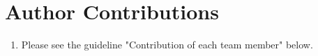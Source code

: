 \documentclass[11pt,letterpaper]{article}
\begin{document}
\section{Author Contributions}
{\color{red}
\begin{enumerate}
    \item Please see the guideline "Contribution of each team member" below.
\end{enumerate}
}

\newpage


\end{document}
